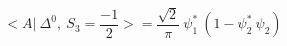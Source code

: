 \begin{equation}
<A|~\Delta^{0},~ S_3=\frac{-1}{2} >= \frac{\sqrt{2}}{\pi} ~\psi_1^*~(1-\psi_2^*~\psi_2)
\end{equation}

